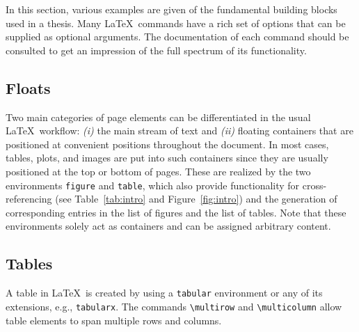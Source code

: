 In this section, various examples are given of the fundamental building blocks used in a thesis.
Many \LaTeX\ commands have a rich set of options that can be supplied as optional arguments.
The documentation of each command should be consulted to get an impression of the full spectrum of its functionality.

\subsection{Floats}

Two main categories of page elements can be differentiated in the usual \LaTeX\ workflow: \textit{(i)} the main stream of text and \textit{(ii)} floating containers that are positioned at convenient positions throughout the document.
In most cases, tables, plots, and images are put into such containers since they are usually positioned at the top or bottom of pages.
These are realized by the two environments \verb|figure| and \verb|table|, which also provide functionality for cross-referencing (see Table~\ref{tab:intro} and Figure~\ref{fig:intro}) and the generation of corresponding entries in the list of figures and the list of tables.
Note that these environments solely act as containers and can be assigned arbitrary content.

\subsection{Tables}

A table in \LaTeX\ is created by using a \verb|tabular| environment or any of its extensions, e.g., \verb|tabularx|.
The commands \verb|\multirow| and \verb|\multicolumn| allow table elements to span multiple rows and columns.

